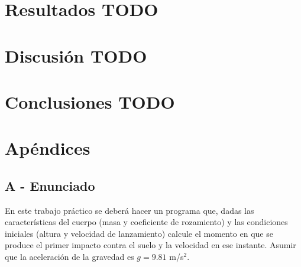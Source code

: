 \documentclass[a4paper]{article}
\begin{document}
\section{Resultados TODO}

\section{Discusión TODO}

\section{Conclusiones TODO}

\newpage

\section{Apéndices}
\subsection{A - Enunciado}

En este trabajo práctico se deberá hacer un programa que, dadas las características del cuerpo (masa y coeficiente de rozamiento) y las condiciones iniciales (altura y velocidad de lanzamiento) calcule el momento en que se produce el primer impacto contra el suelo y la velocidad en ese instante. Asumir que la aceleración de la gravedad es $g = 9.81$ m/s$^2$.
\end{document}
